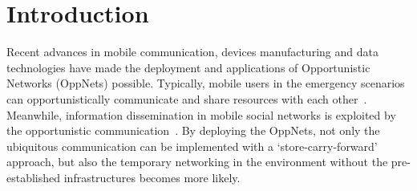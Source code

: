 \section{Introduction}
\label{sec:intro}
Recent advances in mobile communication,
devices manufacturing and data technologies have
made the deployment and applications of Opportunistic Networks
(OppNets) possible.
Typically,
mobile users in the emergency scenarios can
opportunistically communicate and share
resources with each other~\cite{DBLP:journals/tsc/KhalidKKZ14,
DBLP:journals/tmc/ChatzopoulosAKH18,
DBLP:journals/tmc/LiQJHW014}.
Meanwhile,
information dissemination
in mobile social networks is exploited by
the opportunistic communication~\cite{DBLP:journals/tmc/HanHKMSS12}.
By deploying the OppNets,
not only the ubiquitous communication can be
implemented with a `store-carry-forward' approach,
but also the temporary networking
in the environment without the pre-established infrastructures
becomes more likely.

